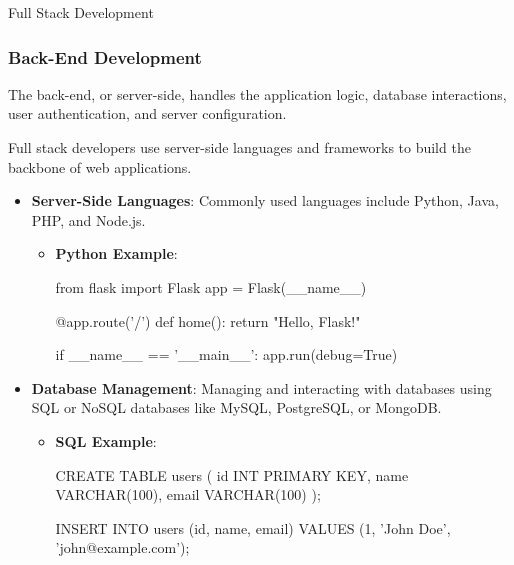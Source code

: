 \begin{notes}{Full Stack Development}
\begin{highlight}
    \end{highlight}
    
    \subsubsection*{Back-End Development}
    
    The back-end, or server-side, handles the application logic, database interactions, user authentication, and server configuration.
    
    \begin{highlight}
    
        Full stack developers use server-side languages and frameworks to build the backbone of web applications.
        
        \begin{itemize}
            \item \textbf{Server-Side Languages}: Commonly used languages include Python, Java, PHP, and Node.js.
            \begin{itemize}
                \item \textbf{Python Example}:
    \begin{code}[Python]
    from flask import Flask
    app = Flask(__name__)

    @app.route('/')
    def home():
        return "Hello, Flask!"
    
    if __name__ == '__main__':
        app.run(debug=True)
    \end{code}
            \end{itemize}
            \item \textbf{Database Management}: Managing and interacting with databases using SQL or NoSQL databases like MySQL, PostgreSQL, or MongoDB.
            \begin{itemize}
                \item \textbf{SQL Example}:
    \begin{code}[SQL]
    CREATE TABLE users (
        id INT PRIMARY KEY,
        name VARCHAR(100),
        email VARCHAR(100)
    );

    INSERT INTO users (id, name, email)
    VALUES (1, 'John Doe', 'john@example.com');
    \end{code}
            \end{itemize}
        \end{itemize}
    
    \end{highlight}
    

\end{notes}

